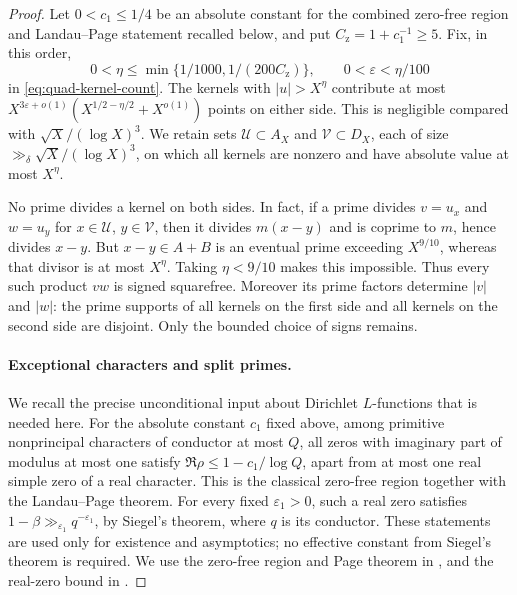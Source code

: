 \begin{proof}
Let $0<c_1\leq1/4$ be an absolute constant for the combined
zero-free region and Landau--Page statement recalled below, and put
$C_{\mathrm z}=1+c_1^{-1}\geq5$.
Fix, in this order,
\[
 0<\eta\leq\min\{1/1000,1/(200C_{\mathrm z})\},\qquad
 0<\varepsilon<\eta/100
\]
in
\eqref{eq:quad-kernel-count}.
The kernels with $|u|>X^\eta$ contribute at most
$X^{3\varepsilon+o(1)}(X^{1/2-\eta/2}+X^{o(1)})$
points on either side.  This is negligible compared with
$\sqrt X/(\log X)^3$.
We retain sets $\mathcal U\subset A_X$ and $\mathcal V\subset D_X$,
each of size $\gg_\delta\sqrt X/(\log X)^3$, on which all kernels
are nonzero and have absolute value at most $X^\eta$.

No prime divides a kernel on both sides.  In fact, if a prime divides
$v=u_x$ and $w=u_y$ for $x\in\mathcal U$, $y\in\mathcal V$, then
it divides $m(x-y)$ and is coprime to $m$, hence divides $x-y$.
But $x-y\in A+B$ is an eventual prime exceeding $X^{9/10}$,
whereas that divisor is at most $X^\eta$.
Taking $\eta<9/10$ makes this impossible.
Thus every such product $vw$ is signed squarefree.  Moreover its
prime factors determine $|v|$ and $|w|$: the prime supports of all
kernels on the first side and all kernels on the second side are
disjoint.  Only the bounded choice of signs remains.

\paragraph{Exceptional characters and split primes.}
We recall the precise unconditional input about Dirichlet
$L$-functions that is needed here.  For the absolute constant $c_1$
fixed above, among primitive nonprincipal characters of conductor at
most $Q$, all zeros with imaginary part of modulus at most one
satisfy
$\Re\rho\leq1-c_1/\log Q$, apart from at most one real simple
zero of a real character.  This is the classical zero-free region
together with the Landau--Page theorem.  For every fixed
$\varepsilon_1>0$, such a real zero satisfies
$1-\beta\gg_{\varepsilon_1}q^{-\varepsilon_1}$, by Siegel's
theorem, where $q$ is its conductor.  These statements are used only
for existence and asymptotics; no effective constant from Siegel's
theorem is required.  We use the zero-free region and Page theorem in
\cite[Theorem~11.3 and Corollary~11.10]{MontgomeryVaughan2007},
and the real-zero bound in
\cite[Corollary~11.15]{MontgomeryVaughan2007}.


\end{proof}
